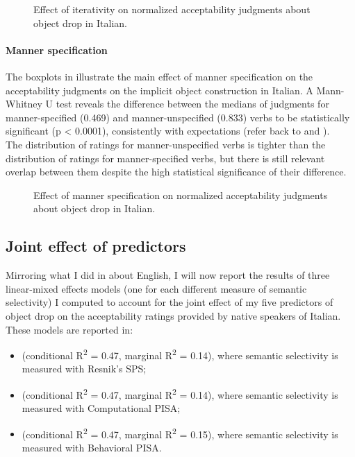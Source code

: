 \begin{figure}[htb]
\caption{Effect of iterativity on normalized acceptability judgments about object drop in Italian.}
    
\end{figure}

\paragraph{Manner specification}
The boxplots in  illustrate the main effect of manner specification on the acceptability judgments on the implicit object construction in Italian. A Mann-Whitney U test reveals the difference between the medians of judgments for manner-specified (0.469) and manner-unspecified (0.833) verbs to be statistically significant (p < 0.0001), consistently with expectations (refer back to  and ).\\
The distribution of ratings for manner-unspecified verbs is tighter than the distribution of ratings for manner-specified verbs, but there is still relevant overlap between them despite the high statistical significance of their difference. %

\begin{figure}[htb]
\caption{Effect of manner specification on normalized acceptability judgments about object drop in Italian.}
    
\end{figure}


\subsection{Joint effect of predictors} 

Mirroring what I did in  about English, I will now report the results of three linear-mixed effects models (one for each different measure of semantic selectivity) I computed to account for the joint effect of my five predictors of object drop on the acceptability ratings provided by native speakers of Italian. These models are reported in:
\begin{itemize}
    \item {} (conditional R\textsuperscript{2} = 0.47, marginal R\textsuperscript{2} = 0.14), where semantic selectivity is measured with Resnik's SPS;
    \item {} (conditional R\textsuperscript{2} = 0.47, marginal R\textsuperscript{2} = 0.14), where semantic selectivity is measured with Computational PISA;
    \item {} (conditional R\textsuperscript{2} = 0.47, marginal R\textsuperscript{2} = 0.15), where semantic selectivity is measured with Behavioral PISA.
\end{itemize}

